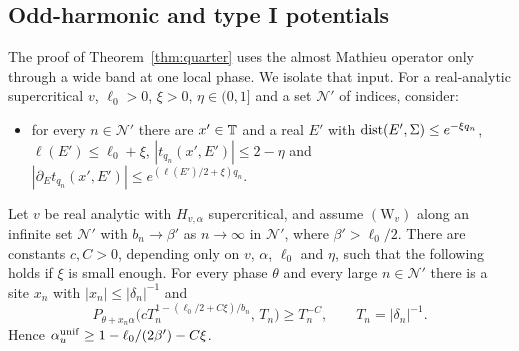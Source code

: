 \subsection{Odd-harmonic and type I potentials}

The proof of Theorem~\ref{thm:quarter} uses the almost Mathieu operator only through a wide band at one local phase. We isolate that input. For a real-analytic supercritical $v$, $\ell_0>0$, $\xi>0$, $\eta\in(0,1]$ and a set $\mathcal N'$ of indices, consider:

\begin{itemize}
\item[$(\mathrm W_v)$] for every $n\in\mathcal N'$ there are $x'\in\mathbb T$ and a real $E'$ with $\operatorname{dist}(E',\Sigma)\le e^{-\xi q_n}$, $\ell(E')\le\ell_0+\xi$, $|t_{q_n}(x',E')|\le2-\eta$ and $|\partial_Et_{q_n}(x',E')|\le e^{(\ell(E')/2+\xi)q_n}$.
\end{itemize}

\begin{theorem}\label{thm:Wv}
Let $v$ be real analytic with $H_{v,\alpha}$ supercritical, and assume $(\mathrm W_v)$ along an infinite set $\mathcal N'$ with $b_n\to\beta'$ as $n\to\infty$ in $\mathcal N'$, where $\beta'>\ell_0/2$. There are constants $c,C>0$, depending only on $v$, $\alpha$, $\ell_0$ and $\eta$, such that the following holds if $\xi$ is small enough. For every phase $\theta$ and every large $n\in\mathcal N'$ there is a site $x_n$ with $|x_n|\le|\delta_n|^{-1}$ and
\[
P_{\theta+x_n\alpha}\bigl(cT_n^{1-(\ell_0/2+C\xi)/b_n},\,T_n\bigr)\ge T_n^{-C},\qquad T_n=|\delta_n|^{-1}.
\]
Hence $\alpha_u^{\mathrm{unif}}\ge1-\ell_0/(2\beta')-C\xi$.
\end{theorem}

